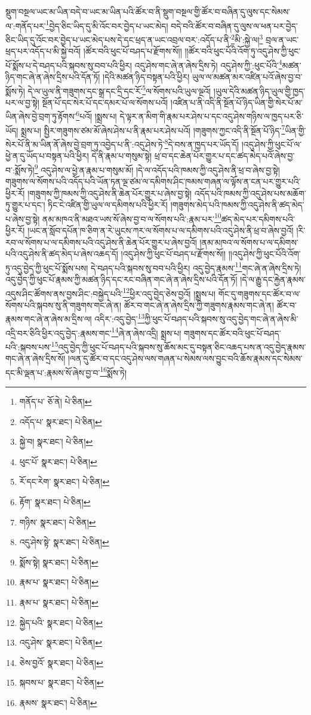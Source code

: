 སྡུག་བསྔལ་ཡང་མ་ཡིན་བདེ་བ་ཡང་མ་ཡིན་པའི་ཚོར་བ་ནི་སྡུག་བསྔལ་གྱི་ཚོར་བ་བཞིན་དུ་ལུས་དང་སེམས་ལ་:གནོད་པར་\footnote{གནོད་པ་  ཅོ་ནེ།  པེ་ཅིན། }བྱེད་ཅིང་ཡིད་དུ་མི་འོང་བར་བྱེད་པ་ཡང་མེད། བདེ་བའི་ཚོར་བ་བཞིན་དུ་ལུས་ལ་ཕན་པར་བྱེད་ཅིང་ཡིད་དུ་འོང་བར་བྱེད་པ་ཡང་མེད་པས་དེ་དང་ཕྲད་ན་ཡང་འབྲལ་བར་:འདོད་པ་ནི་\footnote{འདོད་པ་  སྣར་ཐང་།  པེ་ཅིན། }མི་:སྐྱེ་ལ།\footnote{སྐྱེ་བ།  སྣར་ཐང་།  པེ་ཅིན། } བྲལ་ན་ཡང་ཕྲད་པར་འདོད་པ་མི་སྐྱེ་བའོ། །ཚོར་བའི་ཕུང་པོ་བཤད་པ་རྫོགས་སོ།། །།ཚོར་བའི་ཕུང་པོའི་འོག་ཏུ་འདུ་ཤེས་ཀྱི་ཕུང་པོ་སྨོས་པ་དེ་བཤད་པའི་སྐབས་སུ་བབ་པའི་ཕྱིར། འདུ་ཤེས་གང་ཞེ་ན་ཞེས་དྲིས་ཏེ། འདུ་ཤེས་ཀྱི་:ཕུང་པོའི་\footnote{ཕུང་པོ་  སྣར་ཐང་།  པེ་ཅིན། }མཚན་ཉིད་གང་ཞེ་ན་ཞེས་དྲིས་པའི་དོན་ཏོ། །དེའི་མཚན་ཉིད་བསྟན་པའི་ཕྱིར། ཡུལ་ལ་མཚན་མར་འཛིན་པའོ་ཞེས་བྱ་བ་སྨོས་ཏེ། དེ་ལ་ཡུལ་ནི་གཟུགས་དང་སྒྲ་དང་དྲི་དང་རོ་\footnote{རོ་དང་རེག་  སྣར་ཐང་།  པེ་ཅིན། }ལ་སོགས་པའི་ཡུལ་ལྔའོ། །ཡུལ་དེའི་མཚན་ཉིད་ཡུལ་གྱི་ཁྱད་པར་ལ་བྱ་སྟེ། སྔོན་པོ་དང་སེར་པོ་དང་དམར་པོ་ལ་སོགས་པའོ། །འཛིན་པ་ནི་འདི་ནི་སྔོན་པོ་ཉིད་ཡིན་གྱི་སེར་པོ་མ་ཡིན་ཞེས་བྱེ་བྲག་ཏུ་རྟོགས་\footnote{རྟོག་  སྣར་ཐང་།  པེ་ཅིན། }པའོ། །སྨྲས་པ། དེ་ལྟར་ན་མིག་གི་རྣམ་པར་ཤེས་པ་དང་འདུ་ཤེས་གཉིས་ལ་ཁྱད་པར་ཅི་ཡོད། སྨྲས་པ། སྤྱིར་གཟུགས་ཙམ་མོ་ཞེས་ཤེས་པ་ནི་རྣམ་པར་ཤེས་པའོ། །གཟུགས་ཀྱང་འདི་ནི་སྔོན་པོ་ཉིད་\footnote{གཉིས་  སྣར་ཐང་།  པེ་ཅིན། }ཡིན་གྱི་སེར་པོ་ནི་མ་ཡིན་ནོ་ཞེས་བྱེ་བྲག་ཏུ་འབྱེད་པ་ནི་:འདུ་ཤེས་ཏེ་\footnote{འདུ་ཤེས་སྟེ་  སྣར་ཐང་།  པེ་ཅིན། }དེ་བས་ན་ཁྱད་པར་ཡོད་དོ། །འདུ་ཤེས་ཀྱི་ཕུང་པོ་ལ་ཕྱེ་ན་དུ་ཡོད་པ་བསྟན་པའི་ཕྱིར། དེ་ནི་རྣམ་པ་གསུམ་སྟེ། ཕྲ་བ་དང་ཆེན་པོར་གྱུར་པ་དང་ཚད་མེད་པའོ་ཞེས་བྱ་བ་:སྨོས་ཏེ།\footnote{སྨོས་སྟེ།  སྣར་ཐང་།  པེ་ཅིན། } འདུ་ཤེས་ལ་ཕྱེ་ན་རྣམ་པ་གསུམ་མོ། །དེ་ལ་འདོད་པའི་ཁམས་ཀྱི་འདུ་ཤེས་ནི་ཕྲ་བ་ཞེས་བྱ་སྟེ། གཟུགས་ལ་སོགས་པའི་འདོད་པའི་ཡོན་ཏན་ལྔ་ཙམ་ལ་དམིགས་ཤིང་ཁམས་གཞན་ལ་ལྟོས་ན་ངན་པར་གྱུར་པའི་ཕྱིར་རོ། །གཟུགས་ཀྱི་ཁམས་ཀྱི་འདུ་ཤེས་ནི་ཆེན་པོར་གྱུར་པ་ཞེས་བྱ་སྟེ། འདོད་པའི་ཁམས་ཀྱི་འདུ་ཤེས་པས་མཆོག་ཏུ་གྱུར་པ་དང་། ཏིང་ངེ་འཛིན་གྱི་ཡུལ་ལ་དམིགས་པའི་ཕྱིར་རོ། །གཟུགས་མེད་པའི་ཁམས་ཀྱི་འདུ་ཤེས་ནི་ཚད་མེད་པ་ཞེས་བྱ་སྟེ། ནམ་མཁའ་ནི་མཐའ་ཡས་སོ་ཞེས་བྱ་བ་ལ་སོགས་པའི་:རྣམ་པར་\footnote{རྣམ་པ་  སྣར་ཐང་།  པེ་ཅིན། }ཚད་མེད་པར་དམིགས་པའི་ཕྱིར་རོ། །ཡང་ན་སློབ་དཔོན་ཁ་ཅིག་ན་རེ་ཡུངས་ཀར་ལ་སོགས་པ་ལ་དམིགས་པའི་འདུ་ཤེས་ནི་ཕྲ་བ་ཞེས་བྱའོ། །རི་རབ་ལ་སོགས་པ་ལ་དམིགས་པའི་འདུ་ཤེས་ནི་ཆེན་པོར་གྱུར་པ་ཞེས་བྱའོ། །ནམ་མཁའ་ལ་སོགས་པ་ལ་དམིགས་པའི་འདུ་ཤེས་ནི་ཚད་མེད་པ་ཞེས་འཆད་དོ། །འདུ་ཤེས་ཀྱི་ཕུང་པོ་བཤད་པ་རྫོགས་སོ།། །།འདུ་ཤེས་ཀྱི་ཕུང་པོའི་འོག་ཏུ་འདུ་བྱེད་ཀྱི་ཕུང་པོ་སྨོས་པས། དེ་བཤད་པའི་སྐབས་སུ་བབ་པའི་ཕྱིར། འདུ་བྱེད་རྣམས་\footnote{རྣམ་པ་  སྣར་ཐང་།  པེ་ཅིན། }གང་ཞེ་ན་ཞེས་དྲིས་ཏེ། འདུ་བྱེད་ཀྱི་ཕུང་པོ་རྣམས་ཀྱི་མཚན་ཉིད་དང་རང་བཞིན་གང་ཞེ་ན་ཞེས་དྲིས་པའི་དོན་ཏོ། །དེ་ལ་རྒྱུ་དང་རྐྱེན་རྣམས་འདུས་ཤིང་ཚོགས་ནས་བྱས་ཤིང་:བསྐྱེད་པའི་\footnote{སྐྱེད་པའི་  སྣར་ཐང་།  པེ་ཅིན། }ཕྱིར་འདུ་བྱེད་ཅེས་བྱའོ། །སྨྲས་པ། གོང་དུ་གཟུགས་དང་ཚོར་བ་ལ་སོགས་པའི་སྐབས་སུ་ནི་གཟུགས་གང་ཞེ་ན། ཚོར་བ་གང་ཞེ་ན་ཞེས་དྲིས་ཀྱི་གཟུགས་རྣམས་གང་ཞེ་ན། ཚོར་བ་རྣམས་གང་ཞེ་ན་ཞེས་མ་དྲིས་ལ། འདིར་:འདུ་བྱེད་\footnote{འདུ་ཤེས་  སྣར་ཐང་།  པེ་ཅིན། }ཀྱི་ཕུང་པོ་བཤད་པའི་སྐབས་སུ་འདུ་བྱེད་གང་ཞེ་ན་ཞེས་མི་འདྲི་བར་ཅིའི་ཕྱིར་འདུ་བྱེད་:རྣམས་གང་\footnote{ཅེས་བྱའོ་  སྣར་ཐང་།  པེ་ཅིན། }ཞེ་ན་ཞེས་འདྲི། སྨྲས་པ། གཟུགས་དང་ཚོར་བའི་ཕུང་པོ་བཤད་པའི་:སྐབས་པས་\footnote{སྐབས་པ་  སྣར་ཐང་།  པེ་ཅིན། }འདུ་བྱེད་ཀྱི་ཕུང་པོ་བཤད་པའི་སྐབས་སུ་ཆོས་མང་དུ་བསྟན་ཅིང་འཆད་པས་ན་འདུ་བྱེད་རྣམས་གང་ཞེ་ན་ཞེས་དྲིས་སོ། །ལན་དུ་ཚོར་བ་དང་འདུ་ཤེས་ལས་གཞན་པ་སེམས་ལས་བྱུང་བའི་ཆོས་རྣམས་དང་སེམས་དང་མི་ལྡན་པ་:རྣམས་སོ་ཞེས་བྱ་བ་\footnote{རྣམས་  སྣར་ཐང་།  པེ་ཅིན། }སྨོས་ཏེ། 